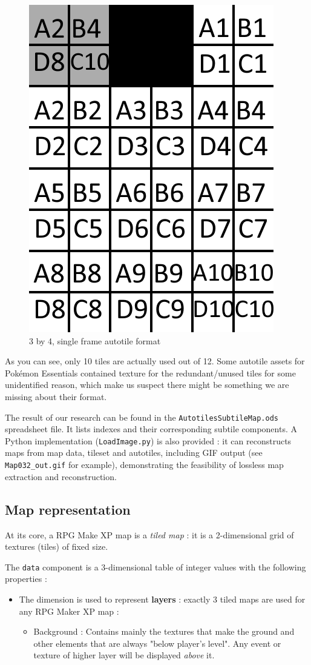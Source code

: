 \documentclass[11pt]{article}
\begin{document}
{\vspace{4mm}
\begin{figure}[!h]
	\centering
	\includegraphics[width=.3\linewidth]{Autotiles_16x16}
	\caption{3 by 4, single frame autotile format}
\end{figure}
\vspace{4mm}

As you can see, only 10 tiles are actually used out of 12. Some autotile assets for Pokémon Essentials contained texture for the redundant/unused tiles for some unidentified reason, which make us suspect there might be something we are missing about their format.

The result of our research can be found in the \verb|AutotilesSubtileMap.ods| spreadsheet file. It lists indexes and their corresponding subtile components. A Python implementation (\verb|LoadImage.py|) is also provided : it can reconstructs maps from map data, tileset and autotiles, including GIF output (see \verb|Map032_out.gif| for example), demonstrating the feasibility of lossless map extraction and reconstruction.




\subsection{Map representation}

At its core, a RPG Make XP map is a \textit{tiled map} : it is a 2-dimensional grid of textures (tiles) of fixed size.

The \verb|data| component is a 3-dimensional table of integer values with the following properties :
\begin{itemize}
	\item The  dimension is used to represent \textbf{layers} : exactly 3 tiled maps are used for any RPG Maker XP map :
	\begin{itemize}
		\item Background : Contains mainly the textures that make the ground and other elements that are always "below player's level". Any event or texture of higher layer will be displayed \textit{above} it.
		

\end{itemize}
\end{itemize}}
\end{document}

